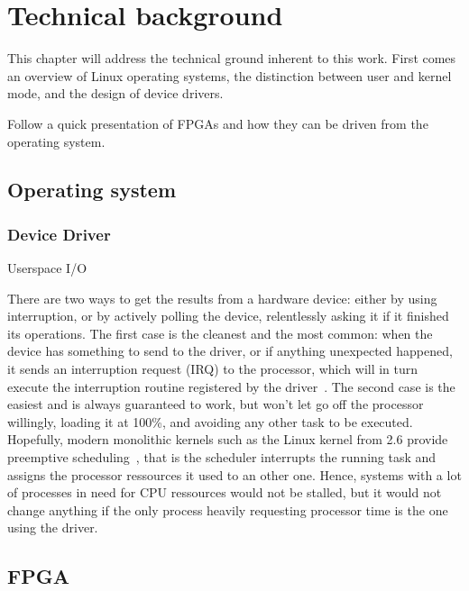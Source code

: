\chapter{Technical background}

This chapter will address the technical ground inherent to this work.
First comes an overview of Linux operating systems, the distinction between user and kernel mode, and the design of device drivers.

Follow a quick presentation of FPGAs and how they can be driven from the operating system.

\section{Operating system}



\subsection{Device Driver}\label{sec:theory-driver}
Userspace I/O~\cite{koch2011}

There are two ways to get the results from a hardware device: either by using interruption, or by actively polling the device, relentlessly asking it if it finished its operations.
The first case is the cleanest and the most common: when the device has something to send to the driver, or if anything unexpected happened, it sends an interruption request (IRQ) to the processor, which will in turn execute the interruption routine registered by the driver~\citep[chap. 10]{Corbet:2005:LDD:1209083}.
The second case is the easiest and is always guaranteed to work, but won't let go off the processor willingly, loading it at 100\%, and avoiding any other task to be executed.
Hopefully, modern monolithic kernels such as the Linux kernel from 2.6 provide preemptive scheduling~\cite{Santhanam2003}, that is the scheduler interrupts the running task and assigns the processor ressources it used to an other one.
Hence, systems with a lot of processes in need for CPU ressources would not be stalled, but it would not change anything if the only process heavily requesting processor time is the one using the driver.

\section{FPGA}

